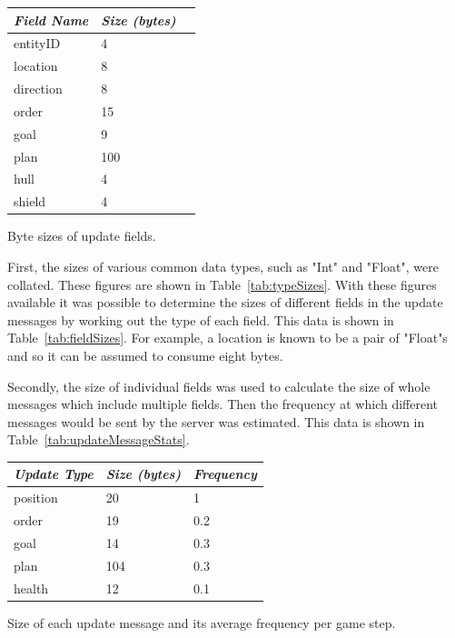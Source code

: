 \begin{margintable}
    \begin{tabular}{p{5em} p{5em} p{5em}}
    \toprule
    \emph{Field Name} & \emph{Size (bytes)} \\
    \midrule
    entityID & 4 \\ 
    location & 8 \\
    direction & 8 \\ 
    order & 15 \\
    goal & 9 \\ 
    plan & 100 \\ 
    hull & 4  \\ 
    shield & 4  \\  
    \bottomrule
    \end{tabular}
    	\vspace{1em}
	\caption[Byte sizes of update fields]{Byte sizes of update fields.}
	\label{tab:fieldSizes}
\end{margintable}

First, the sizes of various common data types, such as "Int" and "Float", were collated. These figures are shown in Table~\ref{tab:typeSizes}. With these figures available it was possible to determine the sizes of different fields in the update messages by working out the type of each field. This data is shown in Table~\ref{tab:fieldSizes}. For example, a location is known to be a pair of "Float"s and so it can be assumed to consume eight bytes.

Secondly, the size of individual fields was used to calculate the size of whole messages which include multiple fields. Then the frequency at which different messages would be sent by the server was estimated. This data is shown in Table~\ref{tab:updateMessageStats}.

\begin{margintable}
    \begin{tabular}{p{5em} p{5em} p{5em}}
    \toprule
    \emph{Update Type} & \emph{Size (bytes)} & \emph{Frequency} \\
    \midrule
    position & 20 & 1 \\ 
    order & 19 & 0.2 \\
    goal & 14 & 0.3 \\
    plan & 104 & 0.3 \\
    health & 12 & 0.1 \\   
    \bottomrule
    \end{tabular}
    	\vspace{1em}
	\caption[Size and frequency of update messages]{Size of each update message and its average frequency per game step.}
	\label{tab:updateMessageStats}
\end{margintable}

